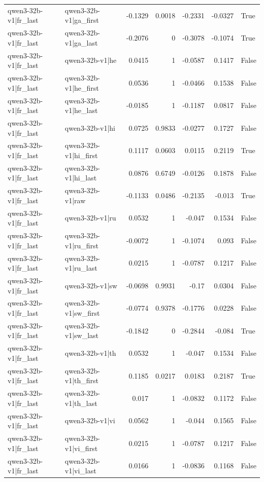 \begin{table}
\begin{tabular}{l l r r r r l}
qwen3-32b-v1|fr_last & qwen3-32b-v1|ga_first & -0.1329 & 0.0018 & -0.2331 & -0.0327 & True \\
qwen3-32b-v1|fr_last & qwen3-32b-v1|ga_last & -0.2076 & 0 & -0.3078 & -0.1074 & True \\
qwen3-32b-v1|fr_last & qwen3-32b-v1|he & 0.0415 & 1 & -0.0587 & 0.1417 & False \\
qwen3-32b-v1|fr_last & qwen3-32b-v1|he_first & 0.0536 & 1 & -0.0466 & 0.1538 & False \\
qwen3-32b-v1|fr_last & qwen3-32b-v1|he_last & -0.0185 & 1 & -0.1187 & 0.0817 & False \\
qwen3-32b-v1|fr_last & qwen3-32b-v1|hi & 0.0725 & 0.9833 & -0.0277 & 0.1727 & False \\
qwen3-32b-v1|fr_last & qwen3-32b-v1|hi_first & 0.1117 & 0.0603 & 0.0115 & 0.2119 & True \\
qwen3-32b-v1|fr_last & qwen3-32b-v1|hi_last & 0.0876 & 0.6749 & -0.0126 & 0.1878 & False \\
qwen3-32b-v1|fr_last & qwen3-32b-v1|raw & -0.1133 & 0.0486 & -0.2135 & -0.013 & True \\
qwen3-32b-v1|fr_last & qwen3-32b-v1|ru & 0.0532 & 1 & -0.047 & 0.1534 & False \\
qwen3-32b-v1|fr_last & qwen3-32b-v1|ru_first & -0.0072 & 1 & -0.1074 & 0.093 & False \\
qwen3-32b-v1|fr_last & qwen3-32b-v1|ru_last & 0.0215 & 1 & -0.0787 & 0.1217 & False \\
qwen3-32b-v1|fr_last & qwen3-32b-v1|sw & -0.0698 & 0.9931 & -0.17 & 0.0304 & False \\
qwen3-32b-v1|fr_last & qwen3-32b-v1|sw_first & -0.0774 & 0.9378 & -0.1776 & 0.0228 & False \\
qwen3-32b-v1|fr_last & qwen3-32b-v1|sw_last & -0.1842 & 0 & -0.2844 & -0.084 & True \\
qwen3-32b-v1|fr_last & qwen3-32b-v1|th & 0.0532 & 1 & -0.047 & 0.1534 & False \\
qwen3-32b-v1|fr_last & qwen3-32b-v1|th_first & 0.1185 & 0.0217 & 0.0183 & 0.2187 & True \\
qwen3-32b-v1|fr_last & qwen3-32b-v1|th_last & 0.017 & 1 & -0.0832 & 0.1172 & False \\
qwen3-32b-v1|fr_last & qwen3-32b-v1|vi & 0.0562 & 1 & -0.044 & 0.1565 & False \\
qwen3-32b-v1|fr_last & qwen3-32b-v1|vi_first & 0.0215 & 1 & -0.0787 & 0.1217 & False \\
qwen3-32b-v1|fr_last & qwen3-32b-v1|vi_last & 0.0166 & 1 & -0.0836 & 0.1168 & False \\

\end{tabular}
\end{table}
